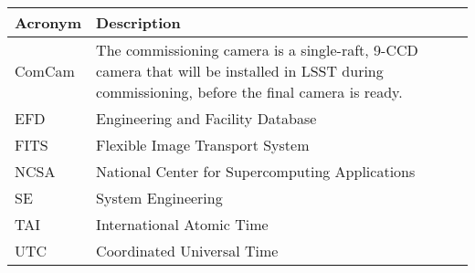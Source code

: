 \addtocounter{table}{-1}
\begin{longtable}{p{}p{}}\hline
\textbf{Acronym} & \textbf{Description}  \\\hline

ComCam & The commissioning camera is a single-raft, 9-CCD camera that will be installed in LSST during commissioning, before the final camera is ready. \\\hline
EFD & Engineering and Facility Database \\\hline
FITS & Flexible Image Transport System \\\hline
NCSA & National Center for Supercomputing Applications \\\hline
SE & System Engineering \\\hline
TAI & International Atomic Time \\\hline
UTC & Coordinated Universal Time \\\hline
\end{longtable}
